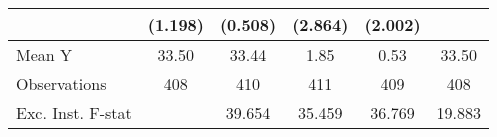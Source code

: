 {\begin{tabular}{l*{5}{c}}
            &     (1.198)         &     (0.508)         &     (2.864)         &     (2.002)         &                     \\
\midrule
Mean Y      &       33.50         &       33.44         &        1.85         &        0.53         &       33.50         \\
Observations&         408         &         410         &         411         &         409         &         408         \\
Exc. Inst. F-stat&                     &      39.654         &      35.459         &      36.769         &      19.883         \\
\bottomrule
\end{tabular}
}
